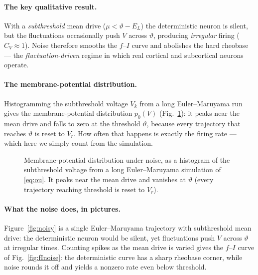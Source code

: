 \documentclass[11pt]{article}
\begin{document}
\paragraph{The key qualitative result.} With a \emph{subthreshold} mean drive ($\mu<\vartheta-E_L$)
the deterministic neuron is silent, but the fluctuations occasionally push $V$ across $\vartheta$,
producing \emph{irregular} firing ($C_V\approx1$). Noise therefore smooths the $f$--$I$ curve and
abolishes the hard rheobase --- the \emph{fluctuation-driven} regime in which real cortical and
subcortical neurons operate.

\paragraph{The membrane-potential distribution.} Histogramming the subthreshold voltage $V_k$ from a
long Euler--Maruyama run gives the membrane-potential distribution $p_0(V)$ (Fig.~\ref{fig:vdist}):
it peaks near the mean drive and falls to zero at the threshold $\vartheta$, because every
trajectory that reaches $\vartheta$ is reset to $V_r$. How often that happens is exactly the firing
rate --- which here we simply count from the simulation.

\begin{figure}[h]
\centering
{}
\caption{Membrane-potential distribution under noise, as a histogram of the subthreshold voltage
from a long Euler--Maruyama simulation of \eqref{eq:ou}. It peaks near the mean drive and vanishes
at $\vartheta$ (every trajectory reaching threshold is reset to $V_r$).}
\label{fig:vdist}
\end{figure}

\paragraph{What the noise does, in pictures.} Figure~\ref{fig:noisy} is a single Euler--Maruyama
trajectory with subthreshold mean drive: the deterministic neuron would be silent, yet fluctuations
push $V$ across $\vartheta$ at irregular times. Counting spikes as the mean drive is varied gives
the $f$--$I$ curve of Fig.~\ref{fig:fInoise}: the deterministic curve has a sharp rheobase corner,
while noise rounds it off and yields a nonzero rate even below threshold.
\end{document}
